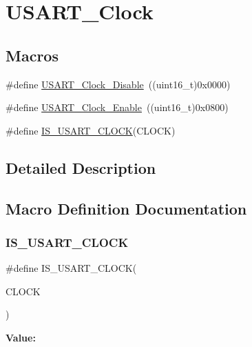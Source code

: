 \hypertarget{group___u_s_a_r_t___clock}{}\section{U\+S\+A\+R\+T\+\_\+\+Clock}
\label{group___u_s_a_r_t___clock}
\subsection*{Macros}
\begin{DoxyCompactItemize}
\item 
\#define \mbox{\hyperlink{group___u_s_a_r_t___clock_ga56c12b81d19853c093e0a373d0c52fb5}{U\+S\+A\+R\+T\+\_\+\+Clock\+\_\+\+Disable}}~((uint16\+\_\+t)0x0000)
\item 
\#define \mbox{\hyperlink{group___u_s_a_r_t___clock_gacfe029e2ec4f49ddde031fd031654caa}{U\+S\+A\+R\+T\+\_\+\+Clock\+\_\+\+Enable}}~((uint16\+\_\+t)0x0800)
\item 
\#define \mbox{\hyperlink{group___u_s_a_r_t___clock_ga0f1e1ba37690b21b7338ed3b06614cf6}{I\+S\+\_\+\+U\+S\+A\+R\+T\+\_\+\+C\+L\+O\+CK}}(C\+L\+O\+CK)
\end{DoxyCompactItemize}


\subsection{Detailed Description}


\subsection{Macro Definition Documentation}
\mbox{\label{group___u_s_a_r_t___clock_ga0f1e1ba37690b21b7338ed3b06614cf6}} 
\subsubsection{\texorpdfstring{IS\_USART\_CLOCK}{IS\_USART\_CLOCK}}
{\footnotesize\ttfamily \#define I\+S\+\_\+\+U\+S\+A\+R\+T\+\_\+\+C\+L\+O\+CK(\begin{DoxyParamCaption}\item[{}]{C\+L\+O\+CK }\end{DoxyParamCaption})}

{\bfseries Value\+:}
\begin{DoxyCode}{0}

\end{DoxyCode}
\mbox{\label{group___u_s_a_r_t___clock_ga56c12b81d19853c093e0a373d0c52fb5}} 
